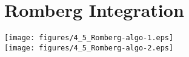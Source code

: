 \section{Romberg Integration}
{%
\flushleft\texttt{[image: figures/4\_5\_Romberg-algo-1.eps]}\\
\flushleft\texttt{[image: figures/4\_5\_Romberg-algo-2.eps]}
}%
